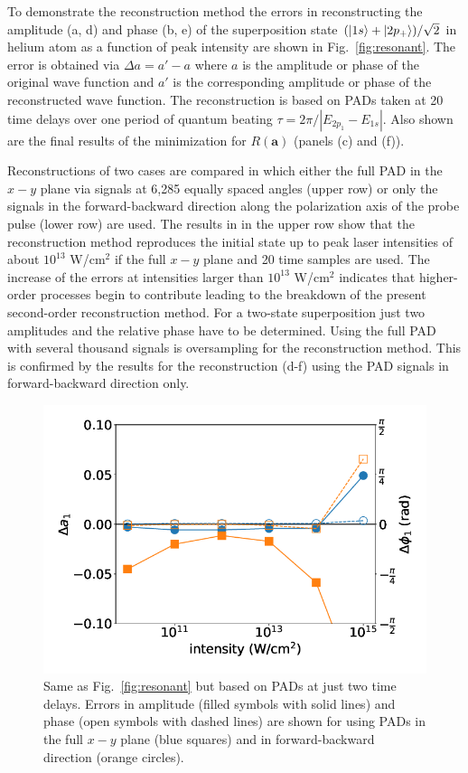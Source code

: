 To demonstrate the reconstruction method the errors in reconstructing the amplitude (a, d) and phase (b, e) of the superposition state $(\ket{1s}+\ket{2p_+})/\sqrt{2}$ in helium atom as a function of peak intensity are shown in Fig.~\ref{fig:resonant}. The error is obtained via $\Delta a = a'-a$ where $a$ is the amplitude or phase of the original wave function and $a'$ is the corresponding amplitude or phase of the reconstructed wave function. The reconstruction is based on PADs taken at 20 time delays over one period of quantum beating $\tau = 2\pi / |E_{2p_1}-E_{1s}|$. Also shown are the final results of the minimization for $R(\mathbf{a})$  (panels (c) and (f)).

 Reconstructions of two cases are compared in which either the full PAD in the $x-y$ plane via signals at 6,285 equally spaced angles  (upper row) or only the signals in the forward-backward direction along the polarization axis of the probe pulse  (lower row) are used. The results in in the upper row show that  the reconstruction method reproduces the initial state up to peak laser intensities of about $10^{13}$ W/cm$^2$ if the full $x-y$ plane and 20 time samples are used. The increase of the errors at intensities larger than $10^{13}$ W/cm$^2$ indicates that higher-order processes  begin to contribute leading to the breakdown of the present second-order reconstruction method. For a two-state superposition just two amplitudes and the relative phase have to be determined. Using the full PAD with several thousand signals is oversampling for the reconstruction method. 
This is confirmed by the results for the reconstruction (d-f) using the PAD signals in forward-backward direction only. 

\begin{figure}[!ht]
\centering
\includegraphics[width=0.5\linewidth]{figs/Photo_ionization/superpositions/Venzke_new_fig_4.png}
\caption{
Same as Fig.\ \ref{fig:resonant} but based on PADs at just two time delays. Errors in amplitude (filled symbols with solid lines) and phase (open symbols with dashed lines) are shown for using PADs in the full $x-y$ plane (blue squares) and in forward-backward direction (orange circles).
} 
  \label{fig:twosamples}
\end{figure}

